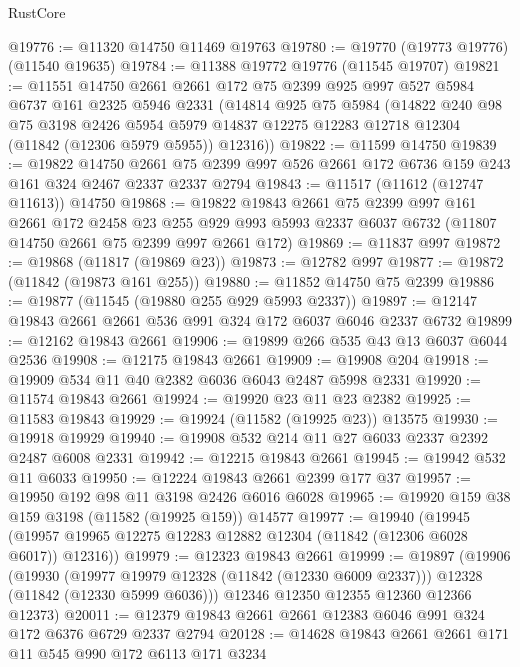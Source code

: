 \begin{lexlean}{RustCore}
\begin{coremodule}
@19776 := @11320 @14750 @11469 @19763
@19780 := @19770 (@19773 @19776) (@11540 @19635)
@19784 := @11388 @19772 @19776 (@11545 @19707)
@19821 := @11551
    @14750
    @2661
    @2661
    @172
    @75
    @2399
    @925
    @997
    @527
    @5984
    @6737
    @161
    @2325
    @5946
    @2331
    (@14814
      @925
      @75
      @5984
      (@14822
        @240
        @98
        @75
        @3198
        @2426
        @5954
        @5979
        @14837
        @12275
        @12283
        @12718
        @12304
        (@11842 (@12306 @5979 @5955))
        @12316))
@19822 := @11599 @14750
@19839 := @19822
    @14750
    @2661
    @75
    @2399
    @997
    @526
    @2661
    @172
    @6736
    @159
    @243
    @161
    @324
    @2467
    @2337
    @2337
    @2794
@19843 := @11517 (@11612 (@12747 @11613)) @14750
@19868 := @19822
    @19843
    @2661
    @75
    @2399
    @997
    @161
    @2661
    @172
    @2458
    @23
    @255
    @929
    @993
    @5993
    @2337
    @6037
    @6732
    (@11807 @14750 @2661 @75 @2399 @997 @2661 @172)
@19869 := @11837 @997
@19872 := @19868 (@11817 (@19869 @23))
@19873 := @12782 @997
@19877 := @19872 (@11842 (@19873 @161 @255))
@19880 := @11852 @14750 @75 @2399
@19886 := @19877 (@11545 (@19880 @255 @929 @5993 @2337))
@19897 := @12147 @19843 @2661 @2661 @536 @991 @324 @172 @6037 @6046 @2337 @6732
@19899 := @12162 @19843 @2661
@19906 := @19899 @266 @535 @43 @13 @6037 @6044 @2536
@19908 := @12175 @19843 @2661
@19909 := @19908 @204
@19918 := @19909 @534 @11 @40 @2382 @6036 @6043 @2487 @5998 @2331
@19920 := @11574 @19843 @2661
@19924 := @19920 @23 @11 @23 @2382
@19925 := @11583 @19843
@19929 := @19924 (@11582 (@19925 @23)) @13575
@19930 := @19918 @19929
@19940 := @19908 @532 @214 @11 @27 @6033 @2337 @2392 @2487 @6008 @2331
@19942 := @12215 @19843 @2661
@19945 := @19942 @532 @11 @6033
@19950 := @12224 @19843 @2661 @2399 @177 @37
@19957 := @19950 @192 @98 @11 @3198 @2426 @6016 @6028
@19965 := @19920 @159 @38 @159 @3198 (@11582 (@19925 @159)) @14577
@19977 := @19940
    (@19945 (@19957 @19965 @12275 @12283 @12882 @12304 (@11842 (@12306 @6028 @6017)) @12316))
@19979 := @12323 @19843 @2661
@19999 := @19897
    (@19906
      (@19930
        (@19977 @19979 @12328 (@11842 (@12330 @6009 @2337)))
        @12328
        (@11842 (@12330 @5999 @6036)))
      @12346
      @12350
      @12355
      @12360
      @12366
      @12373)
@20011 := @12379 @19843 @2661 @2661 @12383 @6046 @991 @324 @172 @6376 @6729 @2337 @2794
@20128 := @14628
    @19843
    @2661
    @2661
    @171
    @11
    @545
    @990
    @172
    @6113
    @171
    @3234

\end{coremodule}
\end{lexlean}
